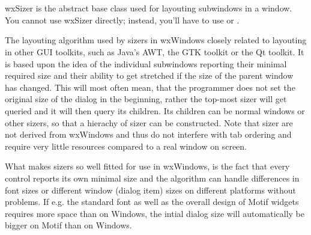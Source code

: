 \section{}\label{wxsizer}

wxSizer is the abstract base class used for layouting subwindows in a window. You
cannot use wxSizer directly; instead, you'll have to use 
or .

The layouting algorithm used by sizers in wxWindows closely related to layouting
in other GUI toolkits, such as Java's AWT, the GTK toolkit or the Qt toolkit. It is
based upon the idea of the individual subwindows reporting their minimal required
size and their ability to get stretched if the size of the parent window has changed.
This will most often mean, that the programmer does not set the original size of
the dialog in the beginning, rather the top-most sizer will get queried and it will 
then query its children. Its children can be normal windows or other sizers, so that
a hierachy of sizer can be constructed. Note that sizer are not derived from wxWindows
and thus do not interfere with tab ordering and require very little resources compared
to a real window on screen.

What makes sizers so well fitted for use in wxWindows, is the fact that every control
reports its own minimal size and the algorithm can handle differences in font sizes
or different window (dialog item) sizes on different platforms without problems. If e.g.
the standard font as well as the overall design of Motif widgets requires more space than
on Windows, the intial dialog size will automatically be bigger on Motif than on Windows.





\label{wxsizerwxsizer}



\label{wxsizerdtor}



\label{wxsizeradd}



